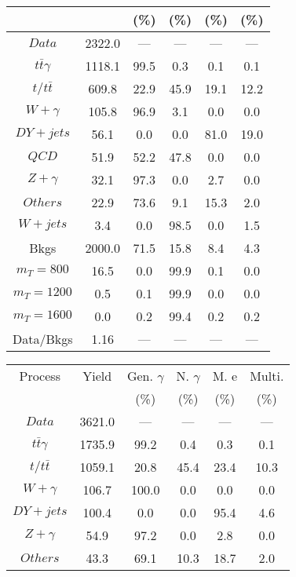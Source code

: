 \begin{figure}
\begin{minipage}[c]{0.32\textwidth}
{\begin{tabular}{cccccc}
 &  & (\%) & (\%) & (\%) & (\%)  \\
\hline
                                                                      $ Data $ &  2322.0 &  --- &  --- &  --- &  ---\\
$ t\bar{t}\gamma $ &  1118.1 &  99.5 &  0.3 &  0.1 &  0.1\\
$ t/t\bar{t} $ &  609.8 &  22.9 &  45.9 &  19.1 &  12.2\\
$ W+\gamma $ &  105.8 &  96.9 &  3.1 &  0.0 &  0.0\\
$ DY+jets $ &  56.1 &  0.0 &  0.0 &  81.0 &  19.0\\
$ QCD $ &  51.9 &  52.2 &  47.8 &  0.0 &  0.0\\
$ Z+\gamma $ &  32.1 &  97.3 &  0.0 &  2.7 &  0.0\\
$ Others $ &  22.9 &  73.6 &  9.1 &  15.3 &  2.0\\
$ W+jets $ &  3.4 &  0.0 &  98.5 &  0.0 &  1.5\\
Bkgs &  2000.0 &  71.5 &  15.8 &  8.4 &  4.3\\
$ m_{T} = 800 $ &  16.5 &  0.0 &  99.9 &  0.1 &  0.0\\
$ m_{T} = 1200 $ &  0.5 &  0.1 &  99.9 &  0.0 &  0.0\\
$ m_{T} = 1600 $ &  0.0 &  0.2 &  99.4 &  0.2 &  0.2\\
Data/Bkgs &  1.16 &  --- &  --- &  --- &  ---\\
\hline
\end{tabular}
}
\end{minipage}
\begin{minipage}[c]{0.32\textwidth}
\centering
\tiny{
\begin{tabular}{cccccc}
\hline
Process & Yield & Gen. $\gamma$ & N. $\gamma$ & M. e & Multi. \\
 &  & (\%) & (\%) & (\%) & (\%)  \\
\hline
                                                                      $ Data $ &  3621.0 &  --- &  --- &  --- &  ---\\
$ t\bar{t}\gamma $ &  1735.9 &  99.2 &  0.4 &  0.3 &  0.1\\
$ t/t\bar{t} $ &  1059.1 &  20.8 &  45.4 &  23.4 &  10.3\\
$ W+\gamma $ &  106.7 &  100.0 &  0.0 &  0.0 &  0.0\\
$ DY+jets $ &  100.4 &  0.0 &  0.0 &  95.4 &  4.6\\
$ Z+\gamma $ &  54.9 &  97.2 &  0.0 &  2.8 &  0.0\\
$ Others $ &  43.3 &  69.1 &  10.3 &  18.7 &  2.0\\

\end{tabular}}
\end{minipage}
\end{figure}
